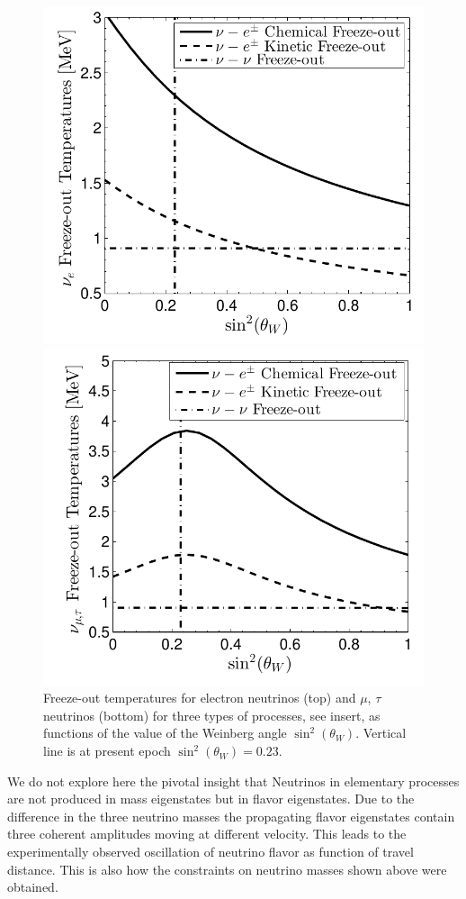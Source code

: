\begin{figure}
\centerline{\includegraphics[width=0.82\linewidth]{04-birrell/ParametricStudies/Figures/nu_e_freezeout.pdf}}
\centerline{\includegraphics[width=0.82\linewidth]{04-birrell/ParametricStudies/Figures/nu_mu_freezeout.pdf}}
\caption{Freeze-out temperatures for electron neutrinos (top) and $\mu$, $\tau$ neutrinos (bottom) for three types of processes, see insert, as functions of the value of the Weinberg angle $\sin^2(\theta_W)$. Vertical line is at present epoch $\sin^2(\theta_W)=0.23$. }
\label{fig:freeze-outT_B}
 \end{figure}

We do not explore here the pivotal insight that Neutrinos in elementary processes are not produced in mass eigenstates but in flavor eigenstates. Due to the difference in the three neutrino masses the propagating flavor eigenstates contain three coherent amplitudes moving at different velocity. This leads to the experimentally observed oscillation of neutrino flavor as function of travel distance. This is also how the constraints on neutrino masses shown above were obtained.

